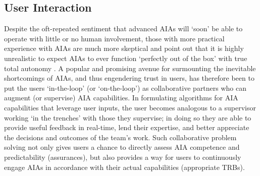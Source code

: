 \subsection{User Interaction} \label{sec:user_interaction}
Despite the oft-repeated sentiment that advanced AIAs will `soon' be able to operate with little or no human involvement, those with more practical experience with AIAs are much more skeptical and point out that it is highly unrealistic to expect AIAs to ever function `perfectly out of the box' with true total autonomy \cite{Bradshaw2013-ck}. 
A popular and promising avenue for surmounting the inevitable shortcomings of AIAs, and thus engendering trust in users, has therefore been to put the users `in-the-loop' (or `on-the-loop') as collaborative partners who can augment (or supervise) AIA capabilities. 
In formulating algorithms for AIA capabilities that leverage user inputs, the user becomes analogous to a supervisor working `in the trenches' with those they supervise; in doing so they are able to provide useful feedback in real-time, lend their expertise, and better appreciate the decisions and outcomes of the team's work. Such collaborative problem solving not only gives users a chance to directly assess AIA competence and predictability (assurances), but also provides a way for users to continuously engage AIAs in accordance with their actual capabilities (appropriate TRBs). 


